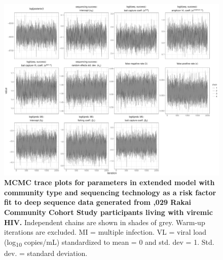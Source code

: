 \documentclass[10pt,letterpaper]{article}
\begin{document}
\begin{figure}[!ht]
 \includegraphics[width=1\textwidth]{../../figures/empirical_commtype_trace.pdf}
\caption{{\bf MCMC trace plots for parameters in extended model with community type and sequencing technology as a risk factor fit to deep sequence data generated from ,029 Rakai Community Cohort Study participants living with viremic HIV.} Independent chains are shown in shades of grey. Warm-up iterations are excluded. MI = multiple infection. VL = viral load (log\textsubscript{10} copies/mL) standardized to mean = 0 and std. dev = 1. Std. dev. = standard deviation. }
\end{figure}
\end{document}
